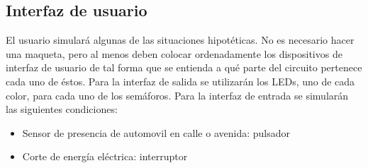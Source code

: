 \subsection{Interfaz de usuario}
El usuario simulará algunas de las situaciones hipotéticas. No es necesario hacer una maqueta, pero al menos deben colocar ordenadamente los dispositivos de interfaz de usuario de tal forma
que se entienda a qué parte del circuito pertenece cada uno de éstos. Para la interfaz de salida se utilizarán los LEDs, uno de cada color, para cada uno de los semáforos. Para la 
interfaz de entrada se simularán las siguientes condiciones:

\begin{itemize}
    \item Sensor de presencia de automovil en calle o avenida: pulsador
    \item Corte de energía eléctrica: interruptor 
\end{itemize}  